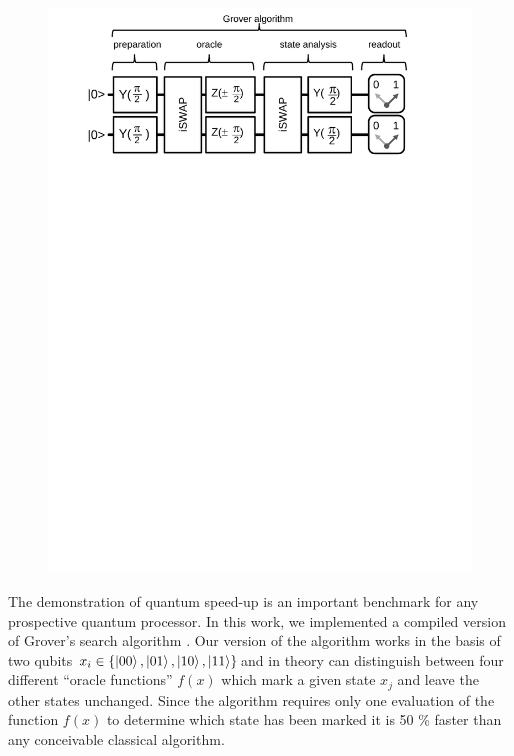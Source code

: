 \begin{figure}[ht!]
	\centering
		\includegraphics[width=1.\textwidth]{./material/papers/grover/figures/grover_algorithm_schematic}
	\label{fig:GroverAlgorithmSchematic}
	\caption{}
\end{figure}

The demonstration of quantum speed-up is an important benchmark for any prospective quantum processor. In this work, we implemented a compiled version of Grover's search algorithm \citep{Grover_Quantum_1997}. Our version of the algorithm works in the basis of two qubits $x_i \in \{\left| 00 \right>,\left| 01 \right>,\left| 10 \right>,\left| 11 \right>\}$and in theory can distinguish between four different ``oracle functions'' $f(x)$ which mark a given state $x_j$ and leave the other states unchanged. Since the algorithm requires only one evaluation of the function $f(x)$ to determine which state has been marked it is 50 \% faster than any conceivable classical algorithm. 


